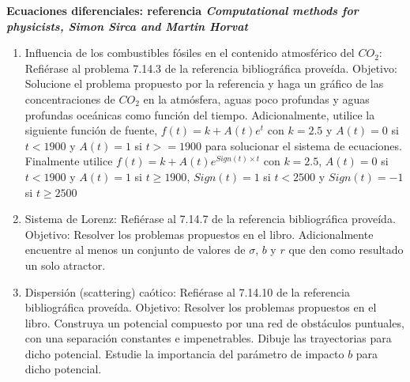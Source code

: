 \documentclass[10.5pt]{article}
\begin{document}
{\bf Ecuaciones diferenciales: referencia {\textit{Computational methods for physicists, Simon Sirca and Martin Horvat}}}
\begin{enumerate}
\item Influencia de los combustibles fósiles en el contenido atmosférico del $CO_{2}$: Refiérase al problema 7.14.3 de la referencia bibliográfica proveída. Objetivo: Solucione el problema propuesto por la referencia y haga un gráfico de las concentraciones de $CO_{2}$ en la atmósfera, aguas poco profundas y aguas profundas oceánicas como función del tiempo. Adicionalmente, utilice la siguiente función de fuente, $f(t)=k+A(t)e^{t}$ con $k=2.5$ y $A(t)=0$ si $t<1900$ y $A(t)=1$ si $t>=1900$ para solucionar el sistema de ecuaciones. Finalmente utilice $f(t)=k+A(t)e^{Sign(t)\times t}$ con $k=2.5$, $A(t)=0$ si $t<1900$ y $A(t)=1$ si $t\ge1900$, $Sign(t)=1$ si $t<2500$ y $Sign(t)=-1$ si $t\ge2500$
\item Sistema de Lorenz: Refiérase al 7.14.7 de la referencia bibliográfica proveída. Objetivo: Resolver los problemas propuestos en el libro. Adicionalmente encuentre al menos un conjunto de valores de $\sigma$, $b$ y $r$ que den como resultado un solo atractor. 
\item Dispersión (scattering) caótico: Refiérase al 7.14.10 de la referencia bibliográfica proveída. Objetivo: Resolver los problemas propuestos en el libro. Construya un potencial compuesto por una red de obstáculos puntuales, con una separación constantes e impenetrables. Dibuje las trayectorias para dicho potencial. Estudie la importancia del parámetro de impacto $b$ para dicho potencial.
\end{enumerate}





%
\end{document}
